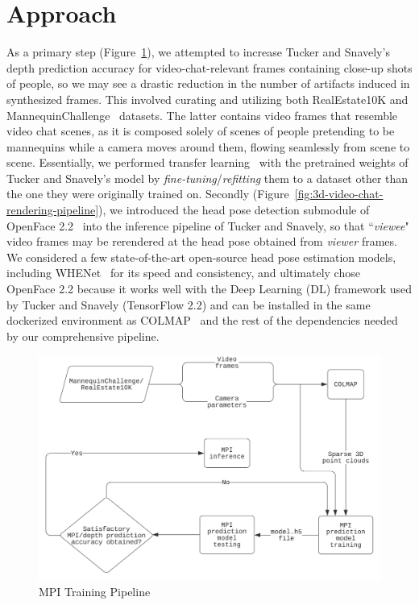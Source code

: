 \section{Approach}\label{sec:approach} 

As a primary step (Figure~\ref{fig:mpi-training-pipeline}), we attempted to increase Tucker and Snavely's depth prediction accuracy for video-chat-relevant frames containing close-up shots of people, so we may see a drastic reduction in the number of artifacts induced in synthesized frames. This involved curating and utilizing both RealEstate10K and MannequinChallenge~\cite{li2019learning} datasets. The latter contains video frames that resemble video chat scenes, as it is composed solely of scenes of people pretending to be mannequins while a camera moves around them, flowing seamlessly from scene to scene. Essentially, we performed transfer learning~\cite{radhakrishnan_what_2019} with the pretrained weights of Tucker and Snavely's model by \textit{fine-tuning}/\textit{refitting} them to a dataset other than the one they were originally trained on. Secondly (Figure~\ref{fig:3d-video-chat-rendering-pipeline}), we introduced the head pose detection submodule of OpenFace 2.2~\cite{baltrusaitis_openface_2018} into the inference pipeline of Tucker and Snavely, so that ``\textit{viewee}" video frames may be rerendered at the head pose obtained from \textit{viewer} frames. We considered a few state-of-the-art open-source head pose estimation models, including WHENet~\cite{zhou_whenet_2020} for its speed and consistency, and ultimately chose OpenFace 2.2 because it works well with the Deep Learning (DL) framework used by Tucker and Snavely (TensorFlow 2.2) and can be installed in the same dockerized environment as COLMAP~\cite{schoenberger2016sfm,schoenberger2016mvs} and the rest of the dependencies needed by our comprehensive pipeline. 

\begin{figure}[!h]
    \includegraphics[width=1\columnwidth]{figures/mpi-training-pipeline.png}
    \caption{MPI Training Pipeline}
    \label{fig:mpi-training-pipeline}
\end{figure}


